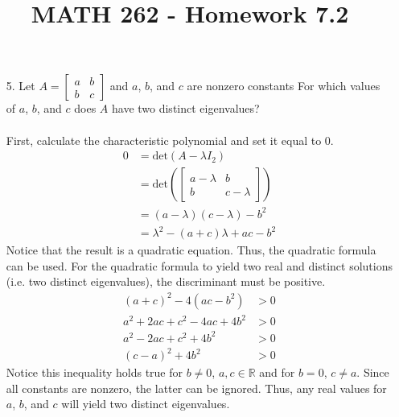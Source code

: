 \documentclass[letterpaper,12pt]{article}
\author{}
\title{MATH 262 - Homework 7.2}
\date{} %
\begin{document}
\maketitle

\begin{enumerate}
  \item[5.]
    Let $A = \begin{bmatrix}a & b \\ b & c\end{bmatrix}$ and $a$, $b$, and $c$ are nonzero constants For which values of $a$, $b$, and $c$ does $A$ have two distinct eigenvalues? \\
    \\
    First, calculate the characteristic polynomial and set it equal to 0.
    \begin{align*}
      0 &= \text{det}(A - \lambda I_2) \\
      &= \text{det}\left(
        \begin{bmatrix}
          a - \lambda & b \\
          b & c - \lambda
        \end{bmatrix}
      \right) \\
      &= (a - \lambda)(c - \lambda) - b^2 \\
      &= \lambda^2 - (a + c)\lambda + ac - b^2
    \end{align*}
    Notice that the result is a quadratic equation. Thus, the quadratic formula can be used. For the quadratic formula to yield two real and distinct solutions (i.e. two distinct eigenvalues), the discriminant must be positive.
    \begin{align*}
      (a + c)^2 - 4(ac - b^2) &> 0 \\
      a^2 + 2ac + c^2 - 4ac + 4b^2 &> 0 \\
      a^2 - 2ac + c^2 + 4b^2 &> 0 \\
      (c - a)^2 + 4b^2 &> 0
    \end{align*}
    Notice this inequality holds true for $b \ne 0$, $a,c \in \mathbb{R}$ and for $b = 0$, $c \ne a$. Since all constants are nonzero, the latter can be ignored. Thus, any real values for $a$, $b$, and $c$ will yield two distinct eigenvalues.
\end{enumerate}
\end{document}
